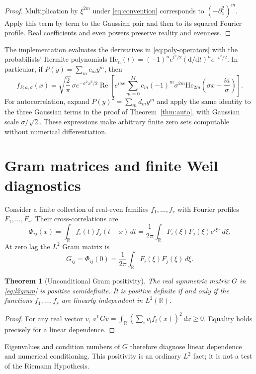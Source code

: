 \documentclass[11pt]{article}
\newtheorem{theorem}{Theorem}
\newcommand{\R}{\mathbb{R}}
\begin{document}
\begin{proof}
Multiplication by $\xi^{2m}$ under \eqref{eq:convention}
corresponds to $(-\partial_x^2)^m$. Apply this term by term to
the Gaussian pair and then to its squared Fourier profile.
Real coefficients and even powers preserve reality and evenness.
\end{proof}

The implementation evaluates the derivatives in
\eqref{eq:poly-operators} with the probabilists' Hermite polynomials
$\mathrm{He}_n(t)=(-1)^n e^{t^2/2}
(\mathrm{d}/\mathrm{d}t)^n e^{-t^2/2}$.
In particular, if $P(y)=\sum_m c_m y^m$, then
\begin{equation}\label{eq:hermite-inverse}
 f_{P,a,\sigma}(x)=\sqrt{\frac2\pi}\,\sigma e^{-\sigma^2x^2/2}
 \operatorname{Re}\!\left[
 e^{iax}\sum_{m=0}^{M}c_m(-1)^m\sigma^{2m}
 \mathrm{He}_{2m}\!\left(\sigma x-\frac{ia}{\sigma}\right)
 \right].
\end{equation}
For autocorrelation, expand $P(y)^2=\sum_m d_m y^m$ and apply
the same identity to the three Gaussian terms in the proof of
Theorem~\ref{thm:auto}, with Gaussian scale $\sigma/\sqrt2$.
These expressions make arbitrary finite zero sets computable
without numerical differentiation.

\section{Gram matrices and finite Weil diagnostics}

Consider a finite collection of real-even families
$f_1,\ldots,f_r$ with Fourier profiles $F_1,\ldots,F_r$.
Their cross-correlations are
\begin{equation}\label{eq:cross}
 \Phi_{ij}(x)=\int_{\R}f_i(t)f_j(t-x)\,dt
 =\frac1{2\pi}\int_{\R}F_i(\xi)F_j(\xi)e^{i\xi x}\,d\xi.
\end{equation}
At zero lag the $L^2$ Gram matrix is
\begin{equation}\label{eq:l2gram}
 G_{ij}=\Phi_{ij}(0)
 =\frac1{2\pi}\int_{\R}F_i(\xi)F_j(\xi)\,d\xi.
\end{equation}
\begin{theorem}[Unconditional Gram positivity]\label{thm:gram}
The real symmetric matrix $G$ in \eqref{eq:l2gram} is positive
semidefinite. It is positive definite if and only if the functions
$f_1,\ldots,f_r$ are linearly independent in $L^2(\R)$.
\end{theorem}
\begin{proof}
For any real vector $v$,
$v^\mathsf{T}Gv=\int_{\R}(\sum_i v_i f_i(x))^2\,dx\geq0$.
Equality holds precisely for a linear dependence.
\end{proof}
Eigenvalues and condition numbers of $G$ therefore diagnose
linear dependence and numerical conditioning. This positivity
is an ordinary $L^2$ fact; it is not a test of the Riemann Hypothesis.
\end{document}
